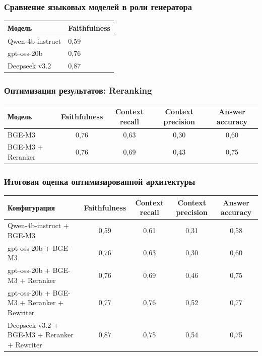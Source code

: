 \documentclass[aspectratio=169, xcolor=table]{beamer} %
\begin{document}
\begin{frame}
\frametitle{Сравнение языковых моделей в роли генератора}
\centering
\renewcommand{\arraystretch}{1.5}
\begin{tabular}{|p{5cm}|p{3cm}|}
    \hline
    \rowcolor{tabgreen} \textbf{Модель} & \textbf{Faithfulness} \\ \hline
    Qwen-4b-instruct & 0,59 \\ \hline
    gpt-oss-20b & 0,76 \\ \hline
    Deepseek v3.2 & 0,87 \\ \hline
\end{tabular}
\end{frame}

\begin{frame}
\frametitle{Оптимизация результатов: Reranking}
\centering
\renewcommand{\arraystretch}{1.5}
\begin{tabular}{|l|c|c|c|c|}
    \hline
    \rowcolor{tabgreen} \textbf{Модель} & \textbf{Faithfulness} & \textbf{Context recall} & \textbf{Context precision} & \textbf{Answer accuracy} \\ \hline
    BGE-M3 & 0,76 & 0,63 & 0,30 & 0,60 \\ \hline
    BGE-M3 + Reranker & 0,76 & 0,69 & 0,43 & 0,75 \\ \hline
\end{tabular}
\end{frame}

\begin{frame}
\frametitle{Итоговая оценка оптимизированной архитектуры}
\centering
\renewcommand{\arraystretch}{1.3}
\small
\begin{tabular}{|p{4.5cm}|c|c|c|c|}
    \hline
    \rowcolor{tabgreen} \textbf{Конфигурация} & \textbf{Faithfulness} & \textbf{Context recall} & \textbf{Context precision} & \textbf{Answer accuracy} \\ \hline
    Qwen-4b-instruct + BGE-M3 & 0,59 & 0,61 & 0,31 & 0,58 \\ \hline
    gpt-oss-20b + BGE-M3 & 0,76 & 0,63 & 0,30 & 0,60 \\ \hline
    gpt-oss-20b + BGE-M3 + Reranker & 0,76 & 0,69 & 0,46 & 0,75 \\ \hline
    gpt-oss-20b + BGE-M3 + Reranker + Rewriter & 0,77 & 0,76 & 0,52 & 0,77 \\ \hline
    Deepseek v3.2 + BGE-M3 + Reranker + Rewriter & 0,87 & 0,75 & 0,54 & 0,75 \\ \hline
\end{tabular}
\end{frame}
\end{document}
